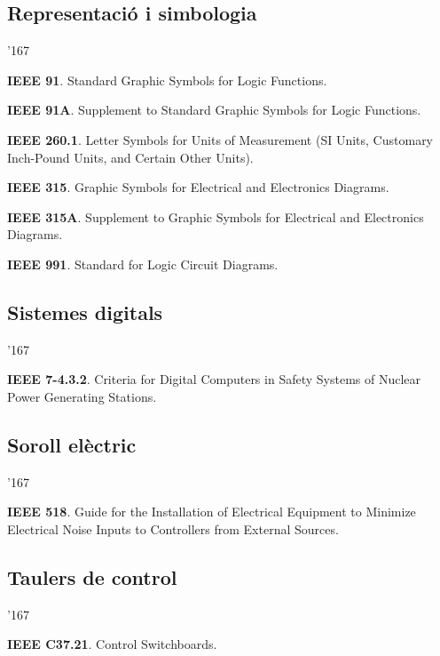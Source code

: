 \subsection*{Representaci\'{o} i simbologia}
\begin{dinglist}{'167}
    \item \textbf{IEEE 91}. Standard Graphic Symbols for Logic Functions.
    \item \textbf{IEEE 91A}. Supplement to Standard Graphic Symbols for Logic Functions.
    \item \textbf{IEEE 260.1}. Letter Symbols for Units of Measurement (SI Units, Customary Inch-Pound Units, and Certain Other Units).
    \item \textbf{IEEE 315}. Graphic Symbols for Electrical and Electronics Diagrams.
    \item \textbf{IEEE 315A}. Supplement to Graphic Symbols for Electrical and Electronics Diagrams.
    \item \textbf{IEEE 991}. Standard for Logic Circuit Diagrams.
\end{dinglist}

\subsection*{Sistemes digitals}
\begin{dinglist}{'167}
    \item \textbf{IEEE 7-4.3.2}. Criteria for Digital Computers in Safety Systems of Nuclear Power Generating Stations.
\end{dinglist}


\subsection*{Soroll el\`{e}ctric}
\begin{dinglist}{'167}
    \item \textbf{IEEE 518}. Guide for the Installation of Electrical Equipment to Minimize Electrical Noise Inputs to Controllers from External Sources.
\end{dinglist}

\subsection*{Taulers de control}
\begin{dinglist}{'167}
    \item \textbf{IEEE C37.21}. Control Switchboards.
\end{dinglist}


